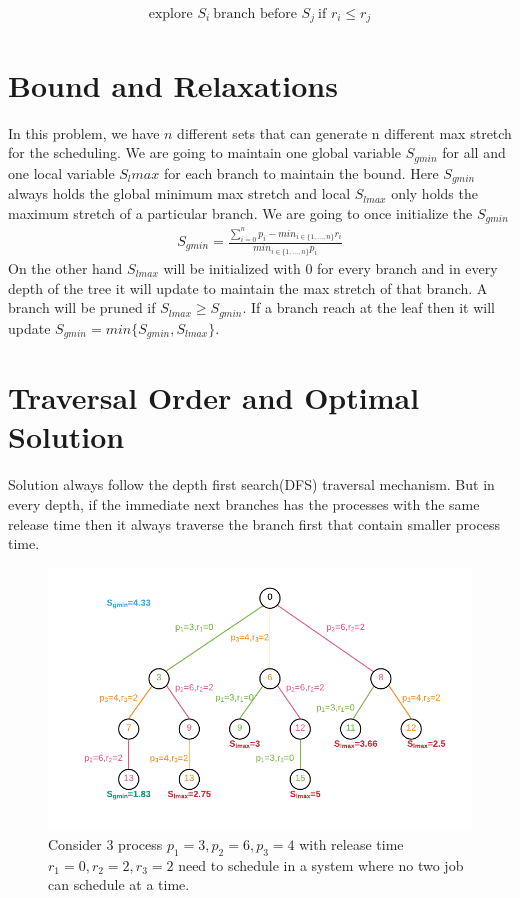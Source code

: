 \documentclass[11pt, conference, onecolumn]{IEEEtran}
\begin{document}
\begin{equation*}
\begin{array}{l}
\text{explore }S_i \ \text{branch before } S_j\ \text{if }  r_{i}\leq r_{j} 
\end{array}
\end{equation*}

\section{Bound and Relaxations}
In this problem, we have $n$ different sets that can generate n different max stretch for the scheduling. We are going to maintain 
one global variable $S_{gmin}$ for all and one local variable $S_lmax$ for each branch to maintain the bound. 
Here $S_{gmin}$  always holds the global minimum max stretch and local $S_{lmax}$ only holds the maximum stretch 
of a particular branch.
We are going to once initialize the $S_{gmin}$
\begin{equation*}
\begin{array}{l}
S_{gmin} = \frac{\sum_{i=0}^{n}p_i - min_{i\in\{1,\dots,n\}}r_i}{min_{i\in\{1,\dots,n\}}p_i}
\end{array}
\end{equation*}
On the other hand $S_{lmax}$ will be initialized with $0$ for every branch and in every depth of the tree it will update to maintain the 
max stretch of that branch. A branch will be pruned if $S_{lmax}\geq S_{gmin}$.  If a branch reach at the leaf then it will update 
$S_{gmin} = min\{S_{gmin}, S_{lmax}\}$. 

\section{Traversal Order and Optimal Solution}
Solution always follow the depth first search(DFS) traversal mechanism. But in every depth, if the immediate next branches has the processes 
with the same release time then it always traverse the branch first that contain smaller process time. 
\begin{figure}
\centering
\includegraphics[width=0.96\linewidth]{schedule.pdf}
\caption{Consider 3 process $p_1=3,p_2=6,p_3=4$ with release time $r_1=0,r_2=2,r_3=2$ need to schedule in a system where no two job can schedule at  a time.}
\end{figure}
\end{document}
